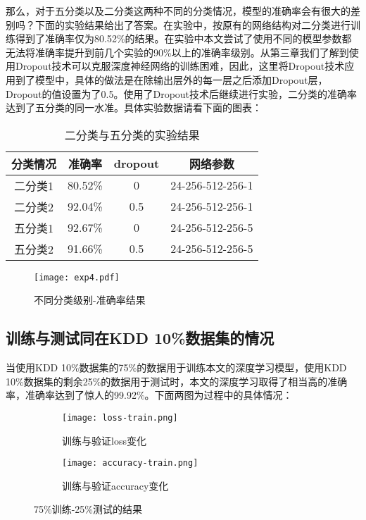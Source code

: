 那么，对于五分类以及二分类这两种不同的分类情况，模型的准确率会有很大的差别吗？下面的实验结果给出了答案。在实验中，按原有的网络结构对二分类进行训练得到了准确率仅为80.52\%的结果。在实验中本文尝试了使用不同的模型参数都无法将准确率提升到前几个实验的90\%以上的准确率级别。从第三章我们了解到使用Dropout技术可以克服深度神经网络的训练困难，因此，这里将Dropout技术应用到了模型中，具体的做法是在除输出层外的每一层之后添加Dropout层，Dropout的值设置为了0.5。使用了Dropout技术后继续进行实验，二分类的准确率达到了五分类的同一水准。具体实验数据请看下面的图表：
\begin{table}[htbp]
	\centering
	\caption{二分类与五分类的实验结果}
	\begin{tabular}{c|c|c|c}
		\toprule
		分类情况 & 准确率  & dropout & 网络参数         \\
		\midrule
		二分类1  & 80.52\% & 0       & 24-256-512-256-1 \\
		\midrule
		二分类2  & 92.04\% & 0.5     & 24-256-512-256-1 \\
		\midrule
		五分类1  & 92.67\% & 0       & 24-256-512-256-5 \\
		\midrule
		五分类2  & 91.66\% & 0.5     & 24-256-512-256-5 \\
		\bottomrule
	\end{tabular}%
	\label{tab:exp4-1}%
\end{table}%

\begin{figure}[H]
    \centering
    \texttt{[image: exp4.pdf]}
    \caption{不同分类级别-准确率结果}
    \label{fig:exp4-2}
\end{figure}

\subsection{训练与测试同在KDD 10\%数据集的情况}

当使用KDD 10\%数据集的75\%的数据用于训练本文的深度学习模型，使用KDD 10\%数据集的剩余25\%的数据用于测试时，本文的深度学习取得了相当高的准确率，准确率达到了惊人的99.92\%。下面两图为过程中的具体情况：
\begin{figure}[H]
	\centering
	\begin{subfigure}{.45\textwidth}
		\centering
		\texttt{[image: loss-train.png]}
		\caption{训练与验证loss变化}
		\label{fig:loss}
	\end{subfigure}
	\begin{subfigure}{.45\textwidth}
		\centering
		\texttt{[image: accuracy-train.png]}
		\caption{训练与验证accuracy变化}
		\label{fig:acc}
	\end{subfigure}
	\caption{75\%训练-25\%测试的结果}
	\label{fig:test_subfigure}
\end{figure}


